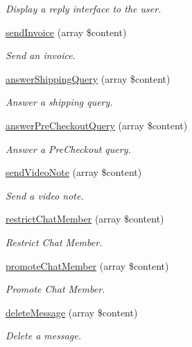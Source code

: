 \begin{DoxyCompactItemize}
\begin{DoxyCompactList}\small\item\em Display a reply interface to the user. \end{DoxyCompactList}\item 
\hyperlink{class_telegram_ae2c4d7308afec34759ccafe4a4f83053}{send\-Invoice} (array \$content)
\begin{DoxyCompactList}\small\item\em Send an invoice. \end{DoxyCompactList}\item 
\hyperlink{class_telegram_a7f8d89bb5061feb40973d2ac31b10a5a}{answer\-Shipping\-Query} (array \$content)
\begin{DoxyCompactList}\small\item\em Answer a shipping query. \end{DoxyCompactList}\item 
\hyperlink{class_telegram_a9eb2fa2623f2cd4f360f5b13fc4bfc73}{answer\-Pre\-Checkout\-Query} (array \$content)
\begin{DoxyCompactList}\small\item\em Answer a Pre\-Checkout query. \end{DoxyCompactList}\item 
\hyperlink{class_telegram_ab40154a0f3a51a0e308ca40cdc0bbdd0}{send\-Video\-Note} (array \$content)
\begin{DoxyCompactList}\small\item\em Send a video note. \end{DoxyCompactList}\item 
\hyperlink{class_telegram_aa0c71f6fb724e8515f0b36eb5cca0bac}{restrict\-Chat\-Member} (array \$content)
\begin{DoxyCompactList}\small\item\em Restrict Chat Member. \end{DoxyCompactList}\item 
\hyperlink{class_telegram_a2021787930735bb9c4ee22b07943447b}{promote\-Chat\-Member} (array \$content)
\begin{DoxyCompactList}\small\item\em Promote Chat Member. \end{DoxyCompactList}\item 
\hyperlink{class_telegram_af46503521fd05da7d9e42313c5f29dd6}{delete\-Message} (array \$content)
\begin{DoxyCompactList}\small\item\em Delete a message. \end{DoxyCompactList}\item 

\end{DoxyCompactItemize}
